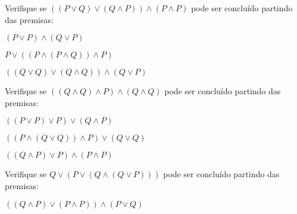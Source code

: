 \documentclass{lib/unichristusdoc}
\begin{document}
    \makeheader

\vspace{1cm}\problem Verifique se $  ( ( P \lor Q ) \lor ( Q \land P ) ) \land ( P \land P )  $ pode ser concluído partindo das premisas: 

\subproblem $  ( P \lor P ) \land ( Q \lor P )  $

\subproblem $  P \lor ( ( P \land ( P \land Q ) ) \land P )  $

\subproblem $  ( ( Q \lor Q ) \lor ( Q \land Q ) ) \land ( Q \lor P )  $

\vspace{1cm}\problem Verifique se $  ( ( Q \land Q ) \land P ) \land ( Q \land Q )  $ pode ser concluído partindo das premisas: 

\subproblem $  ( ( P \lor P ) \lor P ) \lor ( Q \land P )  $

\subproblem $  ( ( P \land ( Q \lor Q ) ) \land P ) \lor ( Q \lor Q )  $

\subproblem $  ( ( Q \land P ) \lor P ) \land ( P \land P )  $

\vspace{1cm}\problem Verifique se $  Q \lor ( P \lor ( Q \land ( Q \lor P ) ) )  $ pode ser concluído partindo das premisas: 

\subproblem $  ( ( Q \land P ) \lor ( P \land P ) ) \land ( P \lor Q )  $
\end{document}
